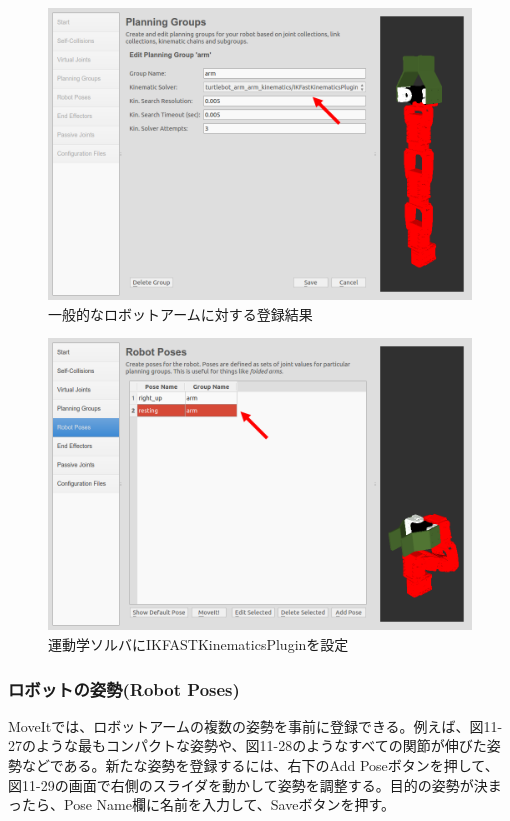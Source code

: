\begin{figure}[ht]
  \centering
  \includegraphics[width=\columnwidth]{pictures/chapter11/pic_11_25.png}
  \caption{一般的なロボットアームに対する登録結果}
\end{figure}

\begin{figure}[ht]
  \centering
  \includegraphics[width=\columnwidth]{pictures/chapter11/pic_11_26.png}
  \caption{運動学ソルバにIKFASTKinematicsPluginを設定}
\end{figure}

\subsubsection{ロボットの姿勢(Robot Poses)}

MoveItでは、ロボットアームの複数の姿勢を事前に登録できる。例えば、図11-27のような最もコンパクトな姿勢や、図11-28のようなすべての関節が伸びた姿勢などである。新たな姿勢を登録するには、右下のAdd Poseボタンを押して、図11-29の画面で右側のスライダを動かして姿勢を調整する。目的の姿勢が決まったら、Pose Name欄に名前を入力して、Saveボタンを押す。

